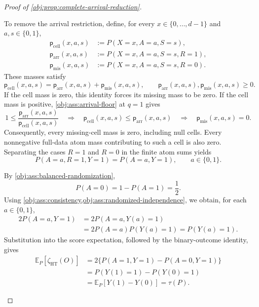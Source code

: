 \begin{proof}[Proof of \cref{obj:prop:complete-arrival-reduction}]
\begin{enumerate}
To remove the arrival restriction, define, for every
\(x\in\{0,\ldots,d-1\}\) and \(a,s\in\{0,1\}\),
\[
\begin{aligned}
\mathsf p_{\mathrm{cell}}(x,a,s)
&:=P(X=x,A=a,S=s),\\
\mathsf p_{\mathrm{arr}}(x,a,s)
&:=P(X=x,A=a,S=s,R=1),\\
\mathsf p_{\mathrm{mis}}(x,a,s)
&:=P(X=x,A=a,S=s,R=0).
\end{aligned}
\]
These masses satisfy
\[
\mathsf p_{\mathrm{cell}}(x,a,s)
=
\mathsf p_{\mathrm{arr}}(x,a,s)
+\mathsf p_{\mathrm{mis}}(x,a,s),
\qquad
\mathsf p_{\mathrm{arr}}(x,a,s),
\mathsf p_{\mathrm{mis}}(x,a,s)\ge0.
\]
If the cell mass is zero, this identity forces its missing mass to be zero. If the cell mass is positive, \cref{obj:ass:arrival-floor} at \(q=1\) gives
\[
1\le
\frac{\mathsf p_{\mathrm{arr}}(x,a,s)}
     {\mathsf p_{\mathrm{cell}}(x,a,s)}
\quad\Longrightarrow\quad
\mathsf p_{\mathrm{cell}}(x,a,s)
\le\mathsf p_{\mathrm{arr}}(x,a,s)
\quad\Longrightarrow\quad
\mathsf p_{\mathrm{mis}}(x,a,s)=0.
\]
Consequently, every missing-cell mass is zero, including null cells. Every nonnegative full-data atom mass contributing to such a cell is also zero. Separating the cases \(R=1\) and \(R=0\) in the finite atom sums yields
\[
P(A=a,R=1,Y=1)=P(A=a,Y=1),
\qquad a\in\{0,1\}.
\]

By \cref{obj:ass:balanced-randomization},
\[
P(A=0)=1-P(A=1)=\frac12.
\]
Using \cref{obj:ass:consistency,obj:ass:randomized-independence}, we obtain, for each \(a\in\{0,1\}\),
\[
\begin{aligned}
2P(A=a,Y=1)
&=2P(A=a,Y(a)=1)\\
&=2P(A=a)P(Y(a)=1)
=P(Y(a)=1).
\end{aligned}
\]
Substitution into the score expectation, followed by the binary-outcome identity, gives
\[
\begin{aligned}
\mathbb E_P[\zeta_{\mathrm{HT}}(O)]
&=2\{P(A=1,Y=1)-P(A=0,Y=1)\}\\
&=P(Y(1)=1)-P(Y(0)=1)\\
&=\mathbb E_P[Y(1)-Y(0)]
=\tau(P).
\end{aligned}
\]


\end{enumerate}
\end{proof}
